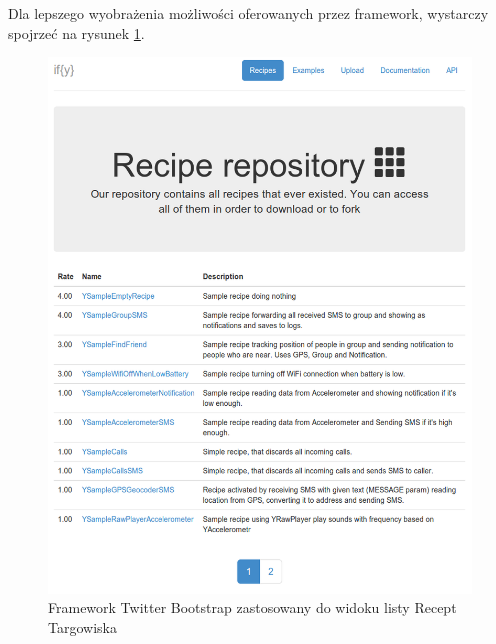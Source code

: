 \documentclass[11pt,a4paper,polish,thesis]{dcsbook}
\begin{document}
Dla lepszego wyobrażenia możliwości oferowanych przez framework, wystarczy spojrzeć na rysunek \ref{fig:market}.
\begin{figure}[p]
  \centering
  \includegraphics[scale=0.5]{./resources/market.png}
  \caption{Framework Twitter Bootstrap zastosowany do widoku listy Recept Targowiska}
  \label{fig:market}
\end{figure}
\end{document}
